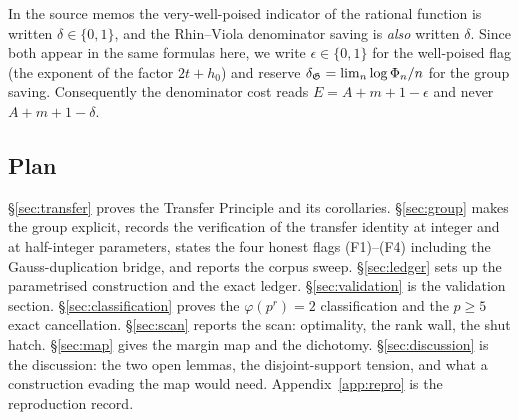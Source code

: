 \begin{convention}\label{conv:rename}
In the source memos the very-well-poised indicator of the rational function is written
$\delta\in\{0,1\}$, and the Rhin--Viola denominator saving is \emph{also} written $\delta$.
Since both appear in the same formulas here, we write $\epsilon\in\{0,1\}$ for the
well-poised flag (the exponent of the factor $2t+h_0$) and reserve
$\delta_{\mathfrak{G}}=\lim_n\log\Phi_n/n$ for the group saving. Consequently the denominator cost reads
$E=A+m+1-\epsilon$ and never $A+m+1-\delta$.
\end{convention}

\subsection{Plan}\label{ss:plan}

\S\ref{sec:transfer} proves the Transfer Principle and its corollaries.
\S\ref{sec:group} makes the group explicit, records the verification of the transfer
identity at integer and at half-integer parameters, states the four honest flags
(F1)--(F4) including the Gauss-duplication bridge, and reports the corpus sweep.
\S\ref{sec:ledger} sets up the parametrised construction and the exact ledger.
\S\ref{sec:validation} is the validation section.
\S\ref{sec:classification} proves the $\varphi(p^r)=2$ classification and the $p\ge5$ exact
cancellation.
\S\ref{sec:scan} reports the scan: optimality, the rank wall, the shut hatch.
\S\ref{sec:map} gives the margin map and the dichotomy.
\S\ref{sec:discussion} is the discussion: the two open lemmas, the disjoint-support tension,
and what a construction evading the map would need. Appendix~\ref{app:repro} is the
reproduction record.
